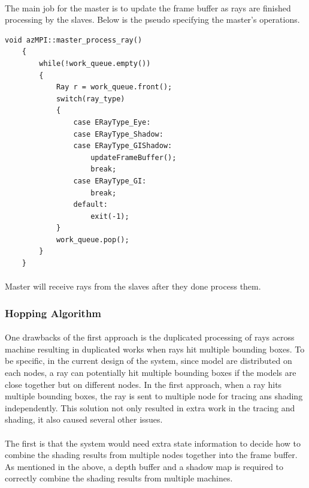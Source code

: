 \documentclass[a4paper, oneside, 10pt]{article}
\begin{document}
\paragraph{} The main job for the master is to update the frame buffer as rays are finished processing by the slaves. Below is the pseudo specifying the master's operations.
 \begin{lstlisting}[frame=single] 
    void azMPI::master_process_ray()
    {
        while(!work_queue.empty())
        {
            Ray r = work_queue.front();
            switch(ray_type)
            {
                case ERayType_Eye:
                case ERayType_Shadow:
                case ERayType_GIShadow:
                    updateFrameBuffer();
                    break;
                case ERayType_GI:
                    break;
                default:
                    exit(-1);
            }
            work_queue.pop();
        }
    }
\end{lstlisting}
\paragraph{} Master will receive rays from the slaves after they done process them.
\subsubsection{Hopping Algorithm}
\paragraph{} One drawbacks of the first approach is the duplicated processing of rays across machine resulting in duplicated works when rays hit multiple bounding boxes. To be specific, in the current design of the system, since model are distributed on each nodes, a ray can potentially hit multiple bounding boxes if the models are close together but on different nodes.  In the first approach, when a ray hits multiple bounding boxes, the ray is sent to multiple node for tracing ans shading independently. This solution not only resulted in extra work in the tracing and shading, it also caused several other issues.
\paragraph{} The first is that the system would need extra state information to decide how to combine the shading results from multiple nodes together into the frame buffer. As mentioned in the above, a depth buffer and a shadow map is required to correctly combine the shading results from multiple machines. 
\end{document}
